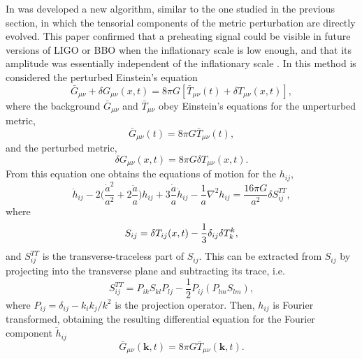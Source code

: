 \documentclass[11pt,a4paper,twoside]{book}
\begin{document}
In \cite{Chap7:SpectralMethod} was developed a new algorithm, similar to the one studied in the previous section, in which  the tensorial components of the metric perturbation are directly evolved. This paper confirmed that a preheating signal could be visible in future versions of LIGO or BBO when the inflationary scale is low enough, and that its amplitude was essentially independent of the inflationary scale \cite{Chap7:SpectralMethodComparison}. In this method is considered the perturbed Einstein's equation
\begin{equation}
\label{chap7:PertubedEinsteinEquation}
\bar{G}_{\mu\nu} + \delta G_{\mu\nu}(x,t) = 8\pi G [\bar{T}_{\mu\nu}(t) + \delta T_{\mu\nu}(x,t)],
\end{equation}
where the background $\bar{G}_{\mu\nu}$ and $ \bar{T}_{\mu\nu} $ obey Einstein's equations for the unperturbed  metric,
\begin{equation}
\label{Chap7:BackgroundMetic}
\bar{G}_{\mu\nu}(t)= 8\pi G \bar{T}_{\mu\nu}(t),
\end{equation}
and the perturbed metric,
\begin{equation}
\label{Chap7:PerturbedEquation}
\delta G_{\mu\nu}(x,t)=8\pi G \delta T_{\mu\nu}(x,t).
\end{equation}
From this equation one obtains the equations of motion for the $ h_{ij} $,
\begin{equation}
	\label{Chap7:EquationGWs}
	\ddot{h}_{ij}-2\Bigg(\frac{\dot{a}^{2}}{a^{2}} + 2\frac{\ddot{a}}{a}\Bigg)h_{ij} + 3\frac{\dot{a}}{a}\dot{h}_{ij}-\frac{1}{a}\nabla^{2}h_{ij} = \frac{16\pi G}{a^{2}} \delta S^{TT}_{ij},
\end{equation}
where 
\begin{equation}
	\label{Chap7:S_{ij}}
	S_{ij}=\delta T_{ij}(x,t) - \frac{1}{3}\delta_{ij}\delta T^{k}_{k},
\end{equation}
and $ S^{TT}_{ij} $ is the transverse-traceless part of $ S_{ij} $. This can be extracted from $ S_{ij} $ by projecting into the transverse plane and subtracting its trace, i.e.
\begin{equation}
\label{Chap7:transverseTracelessPartS}
S_{ij}^{TT}=P_{ik}S_{kl}P_{lj} - \frac{1}{2}P_{ij}(P_{lm}S_{lm}),
\end{equation}
where $ P_{ij}=\delta_{ij}- k_{i}k_{j}/k^{2} $ is the projection operator. Then, $ h_{ij} $ is Fourier transformed, obtaining the resulting differential equation for the Fourier component $\tilde{h}_{ij}$
\begin{equation}
\label{Chap7:SpectralEquation}
\bar{G}_{\mu\nu}(\textbf{k},t) = 8\pi G \bar{T}_{\mu\nu}(\textbf{k},t).
\end{equation}
\end{document}
